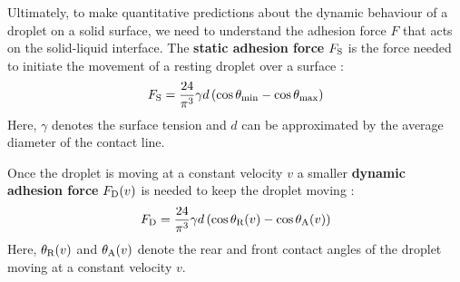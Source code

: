     Ultimately, to make quantitative predictions about the dynamic behaviour of a droplet on a solid surface, we need to understand the adhesion force $F$ that acts on the solid-liquid interface. The \textbf{static adhesion force} $F_{\text{S}}$ is the force needed to initiate the movement of a resting droplet over a surface \cite{04_Pilat_Dynamic-Force}:
    \begin{equation}
        F_{\text{S}} = \frac{24}{\pi^3} \gamma d \left(
            \cos \theta_{\text{min}} - \cos \theta_{\text{max}}
        \right)
    \end{equation}
    Here, $\gamma$ denotes the surface tension and $d$ can be approximated by the average diameter of the contact line. 

    Once the droplet is moving at a constant velocity $v$ a smaller \textbf{dynamic adhesion force} $F_{\text{D}}(v)$ is needed to keep the droplet moving \cite{04_Pilat_Dynamic-Force}:
    \begin{equation}
        F_{\text{D}} = \frac{24}{\pi^3} \gamma d \left(
            \cos \theta_{\text{R}}(v) - \cos \theta_{\text{A}}(v)
        \right)
    \end{equation}
    Here, $\theta_{\text{R}}(v)$ and $\theta_{\text{A}}(v)$ denote the rear and front contact angles of the droplet moving at a constant velocity $v$. \\

